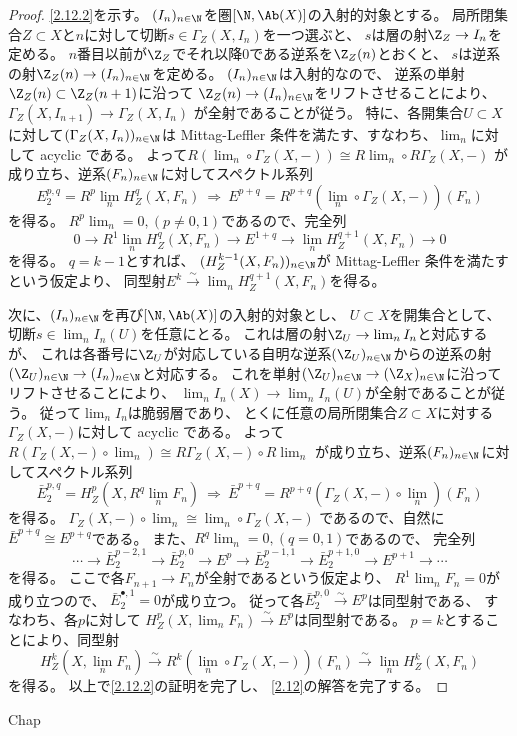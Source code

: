 \documentclass[uplatex,dvipdfmx]{jsarticle}
\begin{document}
\begin{proof}
  \ref{2.12.2}を示す。
  \((I_n)_{n\in \N}\)を圏\([\N,\Ab(X)]\)の入射的対象とする。
  局所閉集合\(Z\subset X\)と\(n\)に対して切断\(s\in \Gamma_Z(X,I_n)\)を一つ選ぶと、
  \(s\)は層の射\(\Z_Z\to I_n\)を定める。
  \(n\)番目以前が\(\Z_Z\)でそれ以降\(0\)である逆系を\(\Z_Z(n)\)とおくと、
  \(s\)は逆系の射\(\Z_Z(n)\to (I_n)_{n\in \N}\)を定める。
  \((I_n)_{n\in \N}\)は入射的なので、
  逆系の単射\(\Z_Z(n)\subset \Z_Z(n+1)\)に沿って
  \(\Z_Z(n)\to (I_n)_{n\in \N}\)をリフトさせることにより、
  \(\Gamma_Z(X,I_{n+1})\to \Gamma_Z(X,I_n)\)
  が全射であることが従う。
  特に、各開集合\(U\subset X\)に対して\((\Gamma_Z(X,I_n))_{n\in \N}\)は
  Mittag-Leffler 条件を満たす、すなわち、\(\lim_n\)に対して acyclic である。
  よって\(R(\lim_n\circ\Gamma_Z(X,-)) \cong R\lim_n \circ R\Gamma_Z(X,-)\)
  が成り立ち、逆系\((F_n)_{n\in \N}\)に対してスペクトル系列
  \[
  E_2^{p,q}=R^p\lim_n H^q_Z(X,F_n) \ \Rightarrow \
  E^{p+q}=R^{p+q}(\lim_n\circ \Gamma_Z(X,-))(F_n)
  \]
  を得る。
  \(R^p\lim_n = 0, (p\neq 0,1)\)であるので、完全列
  \[
  0\to R^1\lim_n H^q_Z(X,F_n) \to E^{1+q} \to \lim_n H^{q+1}_Z(X,F_n)\to 0
  \]
  を得る。
  \(q=k-1\)とすれば、
  \((H^{k-1}_Z(X,F_n))_{n\in \N}\)が Mittag-Leffler 条件を満たすという仮定より、
  同型射\(E^k\xrightarrow{\sim} \lim_n H^{q+1}_Z(X,F_n)\)を得る。

  次に、\((I_n)_{n\in \N}\)を再び\([\N,\Ab(X)]\)の入射的対象とし、
  \(U\subset X\)を開集合として、切断\(s\in \lim_n I_n(U)\)を任意にとる。
  これは層の射\(\Z_U\to \lim_n I_n\)と対応するが、
  これは各番号に\(\Z_U\)が対応している自明な逆系\((\Z_U)_{n\in \N}\)からの逆系の射
  \((\Z_U)_{n\in \N}\to (I_n)_{n\in \N}\)と対応する。
  これを単射\((\Z_U)_{n\in \N}\to (\Z_X)_{n\in \N}\)に沿ってリフトさせることにより、
  \(\lim_nI_n(X)\to \lim_nI_n(U)\)が全射であることが従う。
  従って\(\lim_n I_n\)は脆弱層であり、
  とくに任意の局所閉集合\(Z\subset X\)に対する\(\Gamma_Z(X,-)\)に対して acyclic である。
  よって\(R(\Gamma_Z(X,-)\circ \lim_n) \cong R\Gamma_Z(X,-)\circ R\lim_n\)
  が成り立ち、逆系\((F_n)_{n\in \N}\)に対してスペクトル系列
  \[
  \bar{E}_2^{p,q}=H^p_Z(X,R^q\lim_n F_n) \ \Rightarrow \
  \bar{E}^{p+q}=R^{p+q}(\Gamma_Z(X,-)\circ \lim_n)(F_n)
  \]
  を得る。
  \(\Gamma_Z(X,-)\circ \lim_n\cong \lim_n\circ \Gamma_Z(X,-)\)
  であるので、自然に\(\bar{E}^{p+q}\cong E^{p+q}\)である。
  また、\(R^q\lim_n = 0, (q=0,1)\)であるので、
  完全列
  \[
  \cdots \to \bar{E}_2^{p-2,1} \to \bar{E}_2^{p,0} \to E^p
  \to \bar{E}_2^{p-1,1}\to \bar{E}_2^{p+1,0} \to E^{p+1} \to \cdots
  \]
  を得る。
  ここで各\(F_{n+1}\to F_n\)が全射であるという仮定より、
  \(R^1\lim_n F_n=0\)が成り立つので、
  \(\bar{E}_2^{\bullet,1}=0\)が成り立つ。
  従って各\(\bar{E}_2^{p,0} \xrightarrow{\sim} E^p\)は同型射である、
  すなわち、各\(p\)に対して
  \(H^p_Z(X,\lim_n F_n) \xrightarrow{\sim} E^p\)は同型射である。
  \(p=k\)とすることにより、同型射
  \[
  H^k_Z(X,\lim_n F_n) \xrightarrow{\sim}
  R^k(\lim_n\circ \Gamma_Z(X,-))(F_n) \xrightarrow{\sim}
  \lim_n H^k_Z(X,F_n)
  \]
  を得る。
  以上で\ref{2.12.2}の証明を完了し、
  \autoref{2.12}の解答を完了する。
\end{proof}





\ifcsname Chap\endcsname\else
\printbibliography
\end{document}
